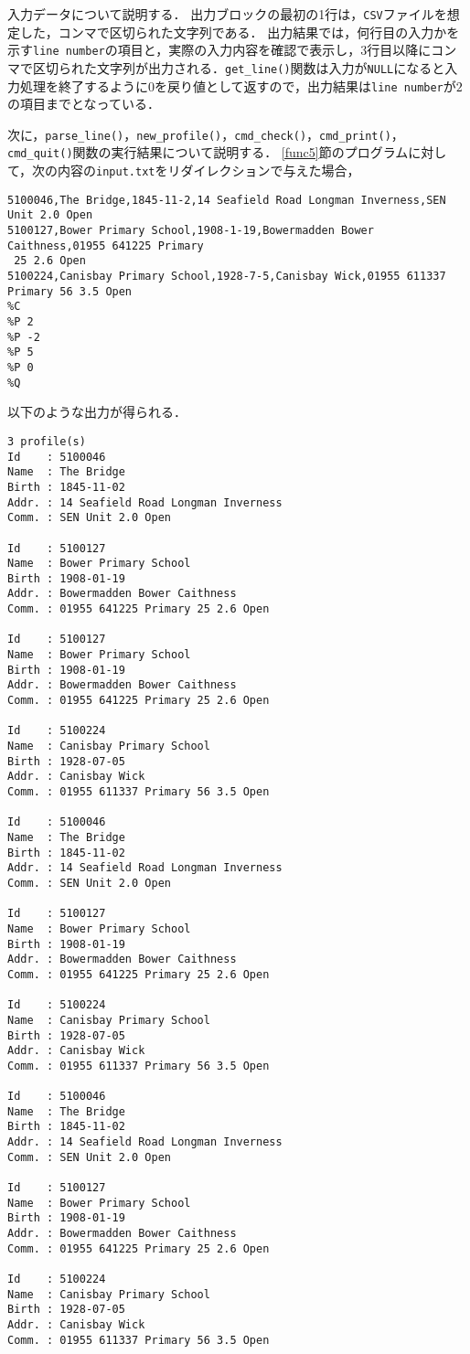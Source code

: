 入力データについて説明する．
出力ブロックの最初の1行は，\verb|CSV|ファイルを想定した，コンマで区切られた文字列である．
出力結果では，何行目の入力かを示す\verb|line number|の項目と，実際の入力内容を確認で表示し，3行目以降にコンマで区切られた文字列が出力される．\verb|get_line()|関数は入力が\verb|NULL|になると入力処理を終了するように$0$を戻り値として返すので，出力結果は\verb|line number|が$2$の項目までとなっている．

次に，\verb|parse_line()|，\verb|new_profile()|，\verb|cmd_check()|，\verb|cmd_print()|，\verb|cmd_quit()|関数の実行結果について説明する．
\ref{func5}節のプログラムに対して，次の内容の\verb|input.txt|をリダイレクションで与えた場合，

{\fontsize{10pt}{11pt} \selectfont
 \begin{verbatim}
5100046,The Bridge,1845-11-2,14 Seafield Road Longman Inverness,SEN Unit 2.0 Open
5100127,Bower Primary School,1908-1-19,Bowermadden Bower Caithness,01955 641225 Primary
 25 2.6 Open
5100224,Canisbay Primary School,1928-7-5,Canisbay Wick,01955 611337 Primary 56 3.5 Open
%C
%P 2
%P -2
%P 5
%P 0
%Q
 \end{verbatim}
}

\noindent %
以下のような出力が得られる．

{\fontsize{10pt}{11pt} \selectfont
 \begin{verbatim}
3 profile(s)
Id    : 5100046
Name  : The Bridge
Birth : 1845-11-02
Addr. : 14 Seafield Road Longman Inverness
Comm. : SEN Unit 2.0 Open

Id    : 5100127
Name  : Bower Primary School
Birth : 1908-01-19
Addr. : Bowermadden Bower Caithness
Comm. : 01955 641225 Primary 25 2.6 Open

Id    : 5100127
Name  : Bower Primary School
Birth : 1908-01-19
Addr. : Bowermadden Bower Caithness
Comm. : 01955 641225 Primary 25 2.6 Open

Id    : 5100224
Name  : Canisbay Primary School
Birth : 1928-07-05
Addr. : Canisbay Wick
Comm. : 01955 611337 Primary 56 3.5 Open

Id    : 5100046
Name  : The Bridge
Birth : 1845-11-02
Addr. : 14 Seafield Road Longman Inverness
Comm. : SEN Unit 2.0 Open

Id    : 5100127
Name  : Bower Primary School
Birth : 1908-01-19
Addr. : Bowermadden Bower Caithness
Comm. : 01955 641225 Primary 25 2.6 Open

Id    : 5100224
Name  : Canisbay Primary School
Birth : 1928-07-05
Addr. : Canisbay Wick
Comm. : 01955 611337 Primary 56 3.5 Open

Id    : 5100046
Name  : The Bridge
Birth : 1845-11-02
Addr. : 14 Seafield Road Longman Inverness
Comm. : SEN Unit 2.0 Open

Id    : 5100127
Name  : Bower Primary School
Birth : 1908-01-19
Addr. : Bowermadden Bower Caithness
Comm. : 01955 641225 Primary 25 2.6 Open

Id    : 5100224
Name  : Canisbay Primary School
Birth : 1928-07-05
Addr. : Canisbay Wick
Comm. : 01955 611337 Primary 56 3.5 Open

 \end{verbatim}
}


